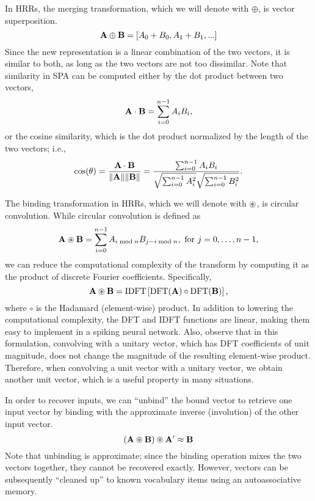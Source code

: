 {{In HRRs,
the merging transformation,
which we will denote with $\oplus$,
is vector superposition.
\begin{equation}
  \mathbf{A} \oplus \mathbf{B} = [A_0 + B_0, A_1 + B_1, ...]
\end{equation}
Since the new representation
is a linear combination of
the two vectors,
it is similar to both,
as long as the two vectors
are not too dissimilar.
Note that similarity in SPA can
be computed either by
the dot product between two vectors,
\begin{equation}
  \mathbf{A} \cdot \mathbf{B} = \sum_{i=0}^{n-1} A_i B_i,
\end{equation}
or the cosine similarity,
which is the dot product normalized
by the length of the two vectors; i.e.,
\begin{equation}
  \cos(\theta) = \frac{\mathbf{A} \cdot \mathbf{B}}{\Vert\mathbf{A}\Vert \Vert\mathbf{B}\Vert}
    = \frac{\sum_{i=0}^{n-1} A_i B_i}
           {\sqrt{\sum_{i=0}^{n-1} A_i^2} \sqrt{\sum_{i=0}^{n-1} B_i^2}}.
\end{equation}

The binding transformation in HRRs,
which we will denote with $\circledast$,
is circular convolution.
While circular convolution
is defined as
\begin{equation}
  \mathbf{A} \circledast \mathbf{B} = \sum_{i=0}^{n-1} A_{i \bmod n}B_{j-i \bmod n},
    \text{ for } j=0, \ldots, n-1,
\end{equation}
we can reduce the computational complexity
of the transform
by computing it as the
product of discrete Fourier coefficients.
Specifically,
\begin{equation}
  \mathbf{A} \circledast \mathbf{B} = \text{IDFT}\left[
    \text{DFT}(\mathbf{A}) \circ \text{DFT}(\mathbf{B})\right],
\end{equation}
where $\circ$ is the Hadamard (element-wise) product.
In addition to lowering
the computational complexity,
the DFT and IDFT functions are linear,
making them easy to implement
in a spiking neural network.
Also, observe that in this formulation,
convolving with a unitary vector,
which has DFT coefficients of unit magnitude,
does not change the magnitude
of the resulting element-wise product.
Therefore, when convolving a unit vector
with a unitary vector,
we obtain another unit vector,
which is a useful property
in many situations.

In order to recover inputs,
we can ``unbind'' the bound vector
to retrieve one input vector
by binding with the approximate inverse (involution)
of the other input vector.
\begin{equation}
  (\mathbf{A} \circledast \mathbf{B}) \circledast \mathbf{A'} \approx \mathbf{B}
\end{equation}
Note that unbinding is approximate;
since the binding operation
mixes the two vectors together,
they cannot be recovered exactly.
However, vectors can be subsequently
``cleaned up'' to known
vocabulary items using an autoassociative memory.

}}
